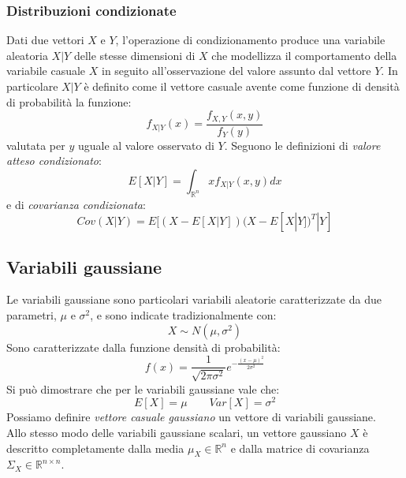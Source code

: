 \subsubsection{Distribuzioni condizionate}
Dati due vettori $X$ e $Y$, l'operazione di condizionamento produce una variabile aleatoria $X|Y$ delle stesse dimensioni di $X$ che modellizza il comportamento della variabile casuale $X$ in seguito all'osservazione del valore assunto dal vettore $Y$.
In particolare $X|Y$ è definito come il vettore casuale avente come funzione di densità di probabilità la funzione:
\begin{equation}
	f_{X|Y}(x)=\frac{f_{X,Y}(x,y)}{f_Y(y)}
\end{equation}
valutata per $y$ uguale al valore osservato di $Y$.
Seguono le definizioni di \textit{valore atteso condizionato}:
\begin{equation}
	E[X|Y]=\int_{\mathbb{R}^n}xf_{X|Y}(x,y)dx
\end{equation}
e di \textit{covarianza condizionata}:
\begin{equation}
	Cov(X|Y)=E[(X-E[X|Y])(X-E[X|Y])^T|Y]
\end{equation}
	

\subsection{Variabili gaussiane}
Le variabili gaussiane sono particolari variabili aleatorie caratterizzate da due parametri, $\mu$ e $\sigma^2$, e sono indicate tradizionalmente con: 
\begin{equation}
X \sim N(\mu ,\sigma^2)
\end{equation}
Sono caratterizzate dalla funzione densità di probabilità: 
\begin{equation}
f(x) = \frac{1}{\sqrt {2\pi\sigma^2}}e^{-\frac{(x-\mu)^2}{2\sigma^2}}
\end{equation}
Si può dimostrare che per le variabili gaussiane vale che: 
\begin{equation}
E[X]= \mu \qquad Var[X]= \sigma^2
\end{equation}
Possiamo definire \textit{vettore casuale gaussiano} un vettore di variabili gaussiane.\\
Allo stesso modo delle variabili gaussiane scalari, un vettore gaussiano $X$ è descritto completamente dalla media $\mu_X \in \mathbb{R}^n$ e dalla matrice di covarianza $\Sigma_X \in \mathbb{R}^{n \times n}$.\\

